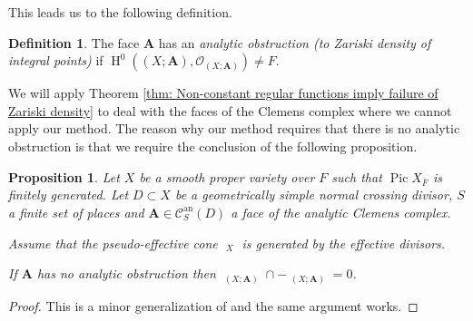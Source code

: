 \documentclass[a4paper,11pt,reqno]{amsart}
\DeclareMathOperator{\Pic}{Pic}
\DeclareMathOperator{\Eff}{\overline{Eff}}
\DeclareMathOperator{\HH}{H}
\DeclareMathOperator{\an}{an}
\newtheorem{proposition}[theorem]{Proposition}
\theoremstyle{definition}
\newtheorem{definition}[theorem]{Definition}
\begin{document}
This leads us to the following definition.
\begin{definition}\label{def:Analytic obstruction}
	The face $\mathbf{A}$ has an \emph{analytic obstruction (to Zariski density of integral points)} if $\HH^0((X ; \mathbf{A}), \mathcal{O}_{(X ; \mathbf{A})}) \neq F$.
\end{definition}

We will apply Theorem \ref{thm: Non-constant regular functions imply failure of Zariski density} to deal with the faces of the Clemens complex where we cannot apply our method. The reason why our method requires that there is no analytic obstruction is that we require the conclusion of the following proposition.
\begin{proposition}\label{prop:pseuo-effective cone has non-zero cone constant}
	Let $X$ be a smooth proper variety over $F$ such that $\Pic X_{\overline{F}}$ is finitely generated. Let $D \subset X$ be a geometrically simple normal crossing divisor, $S$ a finite set of places and $\mathbf{A} \in \mathcal{C}^{\an}_S(D)$ a face of the analytic Clemens complex. 
	
	Assume that the pseudo-effective cone $\Eff_X$ is generated by the effective divisors.
	
	If $\mathbf{A}$ has no analytic obstruction then $\Eff_{(X ; \mathbf{A})} \cap - \Eff_{(X ; \mathbf{A})} = 0$.
\end{proposition}
\begin{proof}
	This is a minor generalization of \cite[Thm.~2.4.1]{Wilsch2022Integral} and the same argument works.
\end{proof}
\end{document}
